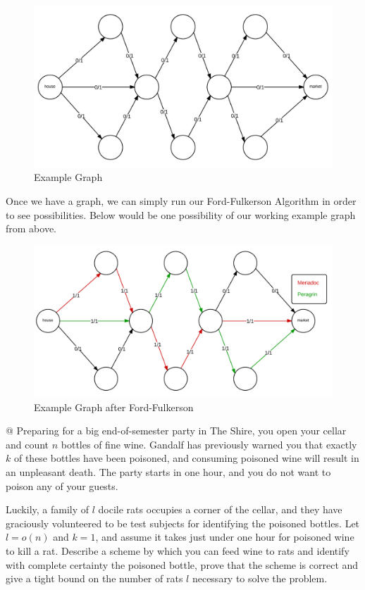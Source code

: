\documentclass[10pt]{article}\usepackage[]{graphicx}\usepackage[]{xcolor}
\begin{document}
\begin{easylist}[enumerate]
    \begin{figure}[H]
        \centering
        \includegraphics[scale=0.5]{./img/ps9-4.png}
        \caption{Example Graph}
    \end{figure}

    Once we have a graph, we can simply run our Ford-Fulkerson Algorithm in order to see possibilities. Below would be
    one possibility of our working example graph from above.

    \begin{figure}[H]
        \centering
        \includegraphics[scale=0.5]{./img/ps9-4-a.png}
        \caption{Example Graph after Ford-Fulkerson}
    \end{figure}

    @ Preparing for a big end-of-semester party in The Shire, you open your cellar and count $n$ bottles of fine wine.
    Gandalf has previously warned you that exactly $k$ of these bottles have been poisoned, and consuming poisoned wine
    will result in an unpleasant death. The party starts in one hour, and you do not want to poison any of your
    guests.\newline

    Luckily, a family of $l$ docile rats occupies a corner of the cellar, and they have graciously volunteered to be
    test subjects for identifying the poisoned bottles. Let $l = o(n)$ and $k = 1$, and assume it takes just under one
    hour for poisoned wine to kill a rat.  Describe a scheme by which you can feed wine to rats and identify with
    complete certainty the poisoned bottle, prove that the scheme is correct and give a tight bound on the number of
    rats $l$ necessary to solve the problem.


\end{easylist}
\end{document}
